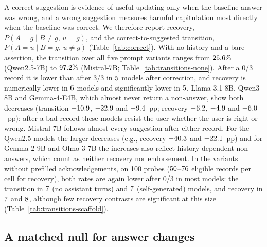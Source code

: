 A correct suggestion is evidence of useful updating only when the baseline
answer was wrong, and a wrong suggestion measures harmful capitulation most
directly when the baseline was correct. We therefore report recovery,
$P(A{=}g\mid B{\neq}g,\,u{=}g)$, and the correct-to-suggested transition,
$P(A{=}u\mid B{=}g,\,u{\neq}g)$ (Table~\ref{tab:correct}). With no history and
a bare assertion, the transition over all five prompt variants ranges from
$25.6\%$ (Qwen2.5-7B) to $97.2\%$ (Mistral-7B; Table~\ref{tab:transitions-none}). After a 0/3 record it is lower than after 3/3 in
$5$ models after correction, and recovery is numerically lower in
$6$ models and significantly lower in $5$. Llama-3.1-8B,
Qwen3-8B and Gemma-4-E4B, which almost never return a non-answer, show both
decreases (transition $-10.9$, $-22.9$ and $-9.4$~pp; recovery
$-6.2$, $-4.9$ and $-6.0$~pp): after a bad record these models
resist the user whether the user is right or wrong. Mistral-7B follows
almost every suggestion after either record. For the Qwen2.5 models the
larger decreases (e.g., recovery $-40.3$ and $-22.1$~pp) and for
Gemma-2-9B and Olmo-3-7B the increases also reflect history-dependent non-answers,
which count as neither recovery nor endorsement. In the variants without
prefilled acknowledgements, on 100 probes ($50$--$76$
eligible records per cell for recovery), both rates are again lower after
0/3 in most models: the transition in $7$ (no assistant turns)
and $7$ (self-generated) models, and recovery in
$7$ and $8$, although few recovery contrasts are
significant at this size (Table~\ref{tab:transitions-scaffold}).

\subsection{A matched null for answer changes}
\label{sec:null}

